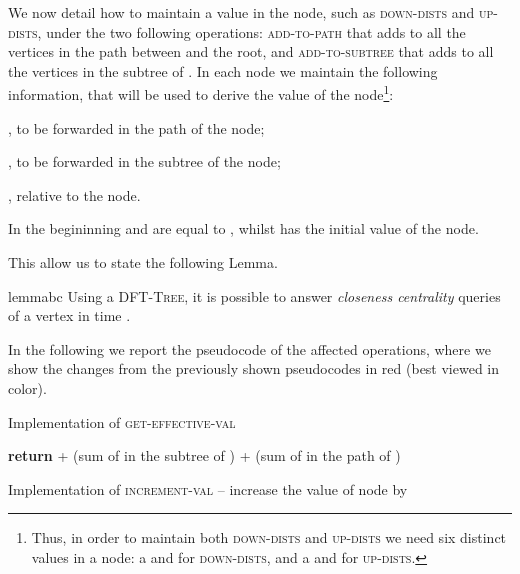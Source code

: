 \documentclass[a4paper,USenglish]{lipics}
\newcommand{\dft}{\textsc{DFT-Tree}}
\begin{document}
We now detail how to maintain a value in the node, such as \textsc{down-dists} and \textsc{up-dists}, under the two following operations: \textsc{add-to-path} that adds  to all the vertices in the path between  and the root, and \textsc{add-to-subtree} that adds  to all the vertices in the subtree of . 
In each node we 	maintain the following information, that will be used to derive the value of the node\footnote{Thus, in order to maintain both \textsc{down-dists} and \textsc{up-dists} we need six distinct values in a node: a  and   for \textsc{down-dists}, and a  and   for \textsc{up-dists}.}:
\begin{compactitem}
				\item , to be forwarded in the path of the node;
				\item , to be forwarded in the subtree of the node;
				\item , relative to the node.
			\end{compactitem}
	

In the begininning  and  are equal to , whilst  has the initial value of the node.

This allow us to state the following Lemma.
\begin{restatable}{lemma}{bc}
Using a \dft, it is possible to answer \emph{closeness centrality} queries of a vertex in time .
\end{restatable}


In the following we report the pseudocode of the affected operations, where we show the changes from the previously shown pseudocodes in red (best viewed in color).
		

			\begin{algorithm}[H]
			  \small
			  \caption{\small Implementation of \textsc{get-effective-val}}
			  \begin{algorithmic}[1]
			    \Comment{}
			    	\State \textbf{return}  + (sum of  in the subtree of ) + (sum of  in the path of )
			    \EndProcedure
			  \end{algorithmic}
			\end{algorithm}
			
			\begin{algorithm}[H]
			  \small
			  \caption{\small Implementation of \textsc{increment-val} -- increase the value of node  by }
			  \begin{algorithmic}[1]
			    \Comment{}
			    	\State 
			    \EndProcedure
			  \end{algorithmic}
			\end{algorithm}	
			
\end{document}
